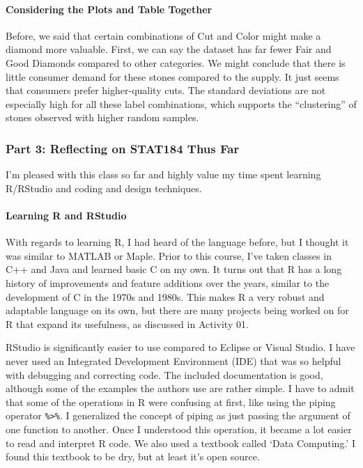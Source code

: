 \documentclass[
]{article}
\begin{document}
\hypertarget{considering-the-plots-and-table-together}{%
\paragraph{Considering the Plots and Table
Together}\label{considering-the-plots-and-table-together}}

Before, we said that certain combinations of Cut and Color might make a
diamond more valuable. First, we can say the dataset has far fewer Fair
and Good Diamonds compared to other categories. We might conclude that
there is little consumer demand for these stones compared to the supply.
It just seems that consumers prefer higher-quality cuts. The standard
deviations are not especially high for all these label combinations,
which supports the ``clustering'' of stones observed with higher random
samples.

\hypertarget{part-3-reflecting-on-stat184-thus-far}{%
\subsubsection{Part 3: Reflecting on STAT184 Thus
Far}\label{part-3-reflecting-on-stat184-thus-far}}

I'm pleased with this class so far and highly value my time spent
learning R/RStudio and coding and design techniques.

\hypertarget{learning-r-and-rstudio}{%
\paragraph{Learning R and RStudio}\label{learning-r-and-rstudio}}

With regards to learning R, I had heard of the language before, but I
thought it was similar to MATLAB or Maple. Prior to this course, I've
taken classes in C++ and Java and learned basic C on my own. It turns
out that R has a long history of improvements and feature additions over
the years, similar to the development of C in the 1970s and 1980s. This
makes R a very robust and adaptable language on its own, but there are
many projects being worked on for R that expand its usefulness, as
discussed in Activity 01.

RStudio is significantly easier to use compared to Eclipse or Visual
Studio. I have never used an Integrated Development Environment (IDE)
that was so helpful with debugging and correcting code. The included
documentation is good, although some of the examples the authors use are
rather simple. I have to admit that some of the operations in R were
confusing at first, like using the piping operator
\texttt{\%\textgreater{}\%}. I generalized the concept of piping as just
passing the argument of one function to another. Once I understood this
operation, it became a lot easier to read and interpret R code. We also
used a textbook called `Data Computing.' I found this textbook to be
dry, but at least it's open source.
\end{document}
